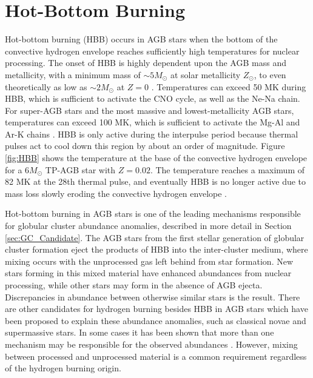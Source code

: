 \section{Hot-Bottom Burning} \label{sec:hot-bottom-burning}


Hot-bottom burning (HBB) occurs in AGB stars when the bottom of the convective hydrogen envelope reaches sufficiently high temperatures for nuclear processing. The onset of HBB is highly dependent upon the AGB mass and metallicity, with a minimum mass of $\sim 5 M_{\odot}$ at solar metallicity $Z_{\odot}$, to even theoretically as low as $\sim 2 M_{\odot}$ at $Z=0$ \cite{Habing2004}. Temperatures can exceed 50 MK during HBB, which is sufficient to activate the CNO cycle, as well as the Ne-Na chain. For super-AGB stars and the most massive and lowest-metallicity AGB stars, temperatures can exceed 100 MK, which is sufficient to activate the Mg-Al and Ar-K chains \cite{Karakas2014}. HBB is only active during the interpulse period because thermal pulses act to cool down this region by about an order of magnitude. Figure \ref{fig:HBB} shows the temperature at the base of the convective hydrogen envelope for a $6 M_{\odot}$ TP-AGB star with $Z = 0.02$. The temperature reaches a maximum of 82 MK at the 28th thermal pulse, and eventually HBB is no longer active due to mass loss slowly eroding the convective hydrogen envelope \cite{Karakas2014}.

Hot-bottom burning in AGB stars is one of the leading mechanisms responsible for globular cluster abundance anomalies, described in more detail in Section \ref{sec:GC_Candidate}. The AGB stars from the first stellar generation of globular cluster formation eject the products of HBB into the inter-cluster medium, where mixing occurs with the unprocessed gas left behind from star formation. New stars forming in this mixed material have enhanced abundances from nuclear processing, while other stars may form in the absence of AGB ejecta. Discrepancies in abundance between otherwise similar stars is the result. There are other candidates for hydrogen burning besides HBB in AGB stars which have been proposed to explain these abundance anomalies, such as classical novae and supermassive stars. In some cases it has been shown that more than one mechanism may be responsible for the observed abundances \cite{Gratton2019}. However, mixing between processed and unprocessed material is a common requirement regardless of the hydrogen burning origin.

